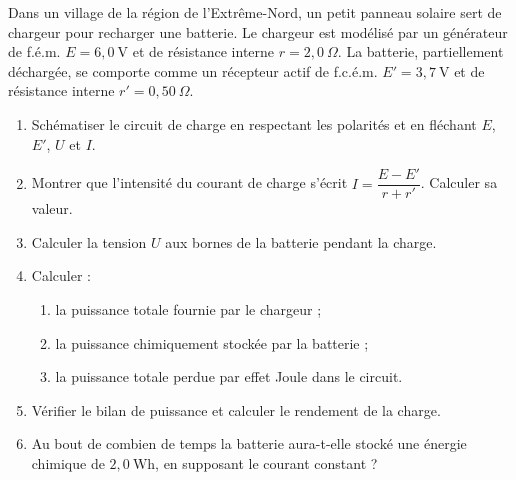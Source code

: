 \documentclass[11pt]{article}
\begin{document}
\begin{exercice}
Dans un village de la région de l'Extrême-Nord, un petit panneau solaire sert de chargeur pour recharger une batterie. Le chargeur est modélisé par un générateur de f.é.m. $E = 6,0~\text{V}$ et de résistance interne $r = 2,0~\Omega$. La batterie, partiellement déchargée, se comporte comme un récepteur actif de f.c.é.m. $E' = 3,7~\text{V}$ et de résistance interne $r' = 0,50~\Omega$.
\begin{enumerate}
\item Schématiser le circuit de charge en respectant les polarités et en fléchant $E$, $E'$, $U$ et $I$.
\item Montrer que l'intensité du courant de charge s'écrit $I = \dfrac{E - E'}{r + r'}$. Calculer sa valeur.
\item Calculer la tension $U$ aux bornes de la batterie pendant la charge.
\item Calculer :
\begin{enumerate}
\item la puissance totale fournie par le chargeur ;
\item la puissance chimiquement stockée par la batterie ;
\item la puissance totale perdue par effet Joule dans le circuit.
\end{enumerate}
\item Vérifier le bilan de puissance et calculer le rendement de la charge.
\item Au bout de combien de temps la batterie aura-t-elle stocké une énergie chimique de $2,0~\text{Wh}$, en supposant le courant constant ?
\end{enumerate}
\end{exercice}
\end{document}
